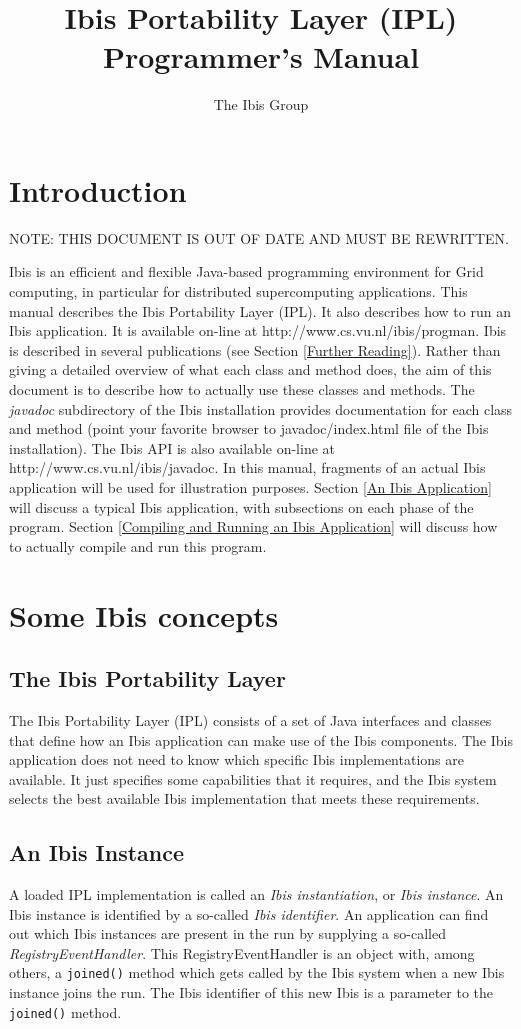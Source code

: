 \documentclass[10pt]{article}
\newcommand{\mysection}[1]{\section{#1}\label{#1}}
\newcommand{\mysubsection}[1]{\subsection{#1}\label{#1}}
\begin{document}
\title{Ibis Portability Layer (IPL) Programmer's Manual}

\author{The Ibis Group}

\maketitle

\section{Introduction}

NOTE: THIS DOCUMENT IS OUT OF DATE AND MUST BE REWRITTEN.

Ibis is an efficient and flexible Java-based programming environment for Grid
computing, in particular for distributed supercomputing applications.
This manual describes the Ibis Portability Layer (IPL). It also describes
how to run an Ibis application.
It is available on-line at http://www.cs.vu.nl/ibis/progman.
Ibis is described in several publications (see Section \ref{Further Reading}).
Rather than giving a detailed overview of what each class and method does,
the aim of this document is to describe how to actually use these classes
and methods.
The \emph{javadoc} subdirectory of the Ibis installation provides
documentation for each class and method (point your favorite browser
to javadoc/index.html file of the Ibis installation).
The Ibis API is also available
on-line at http://www.cs.vu.nl/ibis/javadoc.
In this manual, fragments of an actual Ibis application will be used for
illustration purposes.
Section \ref{An Ibis Application} will discuss a typical Ibis application,
with subsections on each phase of the program.
Section \ref{Compiling and Running an Ibis Application} will discuss how to
actually compile and run this program.

\mysection{Some Ibis concepts}

\mysubsection{The Ibis Portability Layer}

The Ibis Portability Layer (IPL) consists of a set of Java interfaces and
classes that define how an Ibis application can make use of the Ibis components.
The Ibis application does not need to know which specific Ibis implementations
are available.
It just specifies some capabilities that it requires, and the Ibis system
selects the best available Ibis implementation that meets these requirements.
 
\mysubsection{An Ibis Instance}

A loaded IPL implementation is called an \emph{Ibis instantiation}, or 
\emph{Ibis instance}.
An Ibis instance is identified by a so-called
\emph{Ibis identifier}.
An application can find out which Ibis instances are present in the run
by supplying a so-called \emph{RegistryEventHandler}.
This RegistryEventHandler is an object with, among others, a \texttt{joined()}
method which gets called by the Ibis system when a new Ibis instance
joins the run.  The Ibis identifier of this new Ibis is a parameter
to the \texttt{joined()} method.
\end{document}
